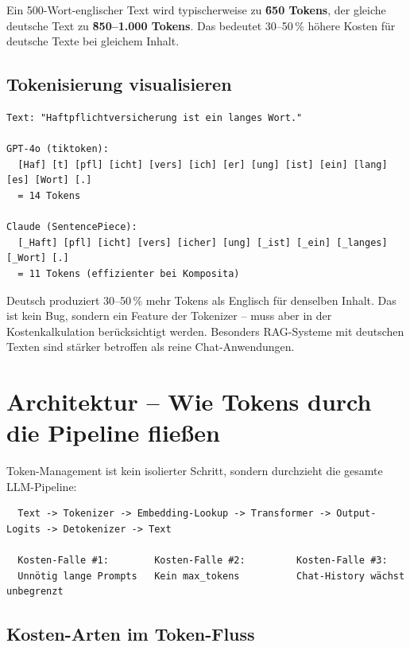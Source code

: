 Ein 500-Wort-englischer Text wird typischerweise zu \textbf{\~650 Tokens}, der gleiche deutsche Text zu \textbf{\~850--1.000 Tokens}. Das bedeutet 30--50\,\% höhere Kosten für deutsche Texte bei gleichem Inhalt.

\subsection{Tokenisierung visualisieren}

\begin{verbatim}
Text: "Haftpflichtversicherung ist ein langes Wort."

GPT-4o (tiktoken):
  [Haf] [t] [pfl] [icht] [vers] [ich] [er] [ung] [ist] [ein] [lang] [es] [Wort] [.]
  = 14 Tokens

Claude (SentencePiece):
  [_Haft] [pfl] [icht] [vers] [icher] [ung] [_ist] [_ein] [_langes] [_Wort] [.]
  = 11 Tokens (effizienter bei Komposita)
\end{verbatim}

\begin{praxishinweis}
Deutsch produziert 30--50\,\% mehr Tokens als Englisch für denselben Inhalt. Das ist kein Bug, sondern ein Feature der Tokenizer -- muss aber in der Kostenkalkulation berücksichtigt werden. Besonders RAG-Systeme mit deutschen Texten sind stärker betroffen als reine Chat-Anwendungen.
\end{praxishinweis}

\section{Architektur -- Wie Tokens durch die Pipeline fließen}

Token-Management ist kein isolierter Schritt, sondern durchzieht die gesamte LLM-Pipeline:

\begin{verbatim}
  Text -> Tokenizer -> Embedding-Lookup -> Transformer -> Output-Logits -> Detokenizer -> Text

  Kosten-Falle #1:        Kosten-Falle #2:         Kosten-Falle #3:
  Unnötig lange Prompts   Kein max_tokens          Chat-History wächst unbegrenzt
\end{verbatim}

\subsection{Kosten-Arten im Token-Fluss}


